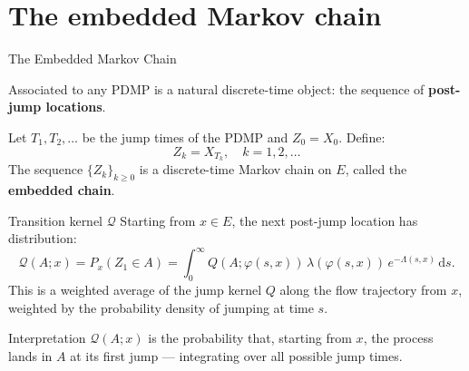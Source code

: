 
\section{The embedded Markov chain}

\begin{frame}{The Embedded Markov Chain}

  Associated to any PDMP is a natural discrete-time object: the
  sequence of \textbf{post-jump locations}.

  \bigskip
  \begin{definition}
    Let $T_1, T_2, \ldots$ be the jump times of the PDMP and
    $Z_0 = X_0$. Define:
    \[
      Z_k = X_{T_k}, \quad k = 1, 2, \ldots
    \]
    The sequence $\{Z_k\}_{k \geq 0}$ is a discrete-time Markov
    chain on $E$, called the \textbf{embedded chain}.
  \end{definition}

  \bigskip
  \begin{block}{Transition kernel $\mathcal{Q}$}
    Starting from $x \in E$, the next post-jump location has
    distribution:
    \[
      \mathcal{Q}(A; x) = P_x(Z_1 \in A)
      = \int_0^\infty Q(A;\varphi(s,x))\,\lambda(\varphi(s,x))\,
      e^{-\Lambda(s,x)}\,\mathrm{d}s.
    \]
    This is a weighted average of the jump kernel $Q$ along the
    flow trajectory from $x$, weighted by the probability density
    of jumping at time $s$.
  \end{block}

  \bigskip
  \begin{block}{Interpretation}
    $\mathcal{Q}(A;x)$ is the probability that, starting from $x$,
    the process lands in $A$ at its first jump --- integrating over
    all possible jump times.
  \end{block}

\end{frame}

